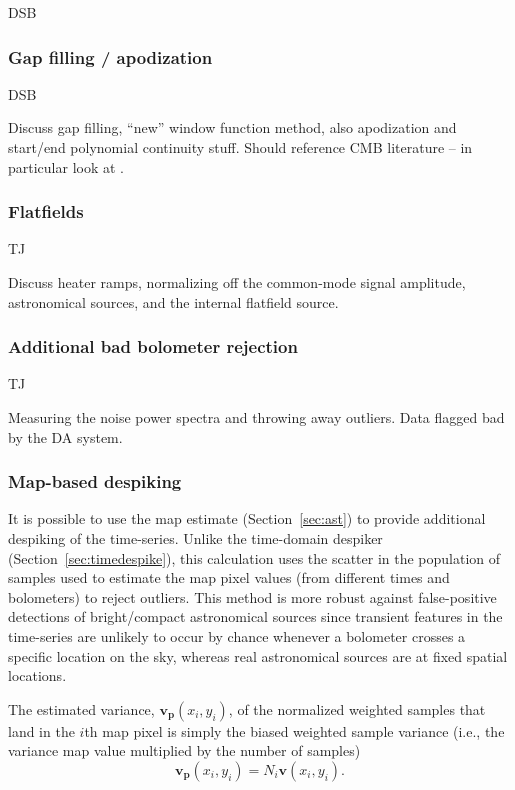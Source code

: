 \documentclass[useAMS,usenatbib,nofootinbib]{mn2e}
\begin{document}
DSB

\subsubsection{Gap filling / apodization}
\label{sec:gaps}

DSB

Discuss gap filling, ``new'' window function method, also apodization
and start/end polynomial continuity stuff. Should reference CMB
literature -- in particular look at \citet{stompor2002}.

\subsubsection{Flatfields}
\label{sec:flatfields}

TJ

Discuss heater ramps, normalizing off the common-mode signal
amplitude, astronomical sources, and the internal flatfield source.

\subsubsection{Additional bad bolometer rejection}

TJ

Measuring the noise power spectra and throwing away outliers. Data
flagged bad by the DA system.

\subsubsection{Map-based despiking}
\label{sec:mapdespike}

It is possible to use the map estimate (Section~\ref{sec:ast}) to
provide additional despiking of the time-series. Unlike the
time-domain despiker (Section~\ref{sec:timedespike}), this calculation
uses the scatter in the population of samples used to estimate the map
pixel values (from different times and bolometers) to reject
outliers. This method is more robust against false-positive detections
of bright/compact astronomical sources since transient features in the
time-series are unlikely to occur by chance whenever a bolometer
crosses a specific location on the sky, whereas real astronomical
sources are at fixed spatial locations.

The estimated variance, $\mathbf{v_p}(x_i,y_i)$, of the normalized
weighted samples that land in the $i$th map pixel is simply the biased
weighted sample variance (i.e., the variance map value multiplied by
the number of samples)
%
\begin{equation}
  \mathbf{v_p}(x_i,y_i) = N_i \mathbf{v}(x_i,y_i).
\end{equation}
\end{document}
